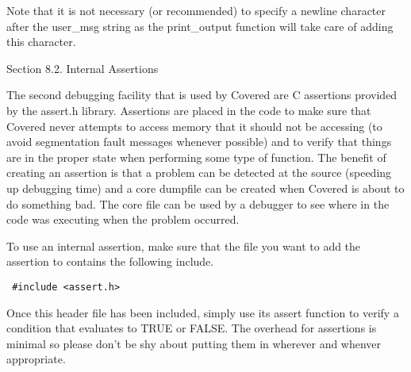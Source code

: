 \begin{Desc}
\item[]Note that it is not necessary (or recommended) to specify a newline character after the user\_\-msg string as the print\_\-output function will take care of adding this character.\end{Desc}
\begin{Desc}
\item[Section 8.2. Internal Assertions]\end{Desc}
\begin{Desc}
\item[]The second debugging facility that is used by Covered are C assertions provided by the assert.h library. Assertions are placed in the code to make sure that Covered never attempts to access memory that it should not be accessing (to avoid segmentation fault messages whenever possible) and to verify that things are in the proper state when performing some type of function. The benefit of creating an assertion is that a problem can be detected at the source (speeding up debugging time) and a core dumpfile can be created when Covered is about to do something bad. The core file can be used by a debugger to see where in the code was executing when the problem occurred.\end{Desc}
\begin{Desc}
\item[]To use an internal assertion, make sure that the file you want to add the assertion to contains the following include.\end{Desc}
\begin{Desc}
\item[]

\footnotesize\begin{verbatim} #include <assert.h>
\end{verbatim}\normalsize
\end{Desc}
\begin{Desc}
\item[]Once this header file has been included, simply use its assert function to verify a condition that evaluates to TRUE or FALSE. The overhead for assertions is minimal so please don't be shy about putting them in wherever and whenver appropriate.\end{Desc}





